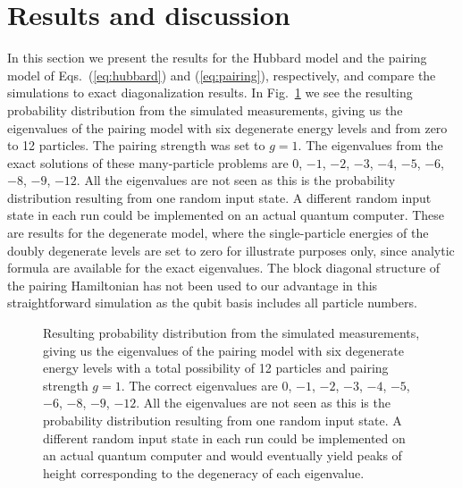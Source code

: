 \documentclass[aps,pra,twocolumn,floatfix]{revtex4}
\begin{document}
\section{Results and discussion}
\label{sec:results}
In this section we present the results for the Hubbard model and the
pairing model of Eqs.~(\ref{eq:hubbard}) and (\ref{eq:pairing}), respectively, and
compare the simulations to exact diagonalization results. 
In Fig.~\ref{fig:P24-13-15IM} we see the resulting probability
distribution from the simulated measurements, giving us the eigenvalues
of the pairing model with six degenerate energy levels and from zero
to  12  particles. 
The pairing strength was set to $g=1$.
The  eigenvalues from the exact solutions of these many-particle
problems are $0$, $-1$, 
$-2$,  $-3$, $-4$, $-5$, $-6$, $-8$, $ -9$, $-12$.
All the eigenvalues are not seen as this is the probability
distribution resulting from one random input state. A
different random input state in each run could be implemented on
an actual quantum computer. These are results for the degenerate
model, where the single-particle energies of the doubly degenerate levels are set to 
zero  for illustrate purposes only, since analytic formula are available for the 
exact eigenvalues. The block diagonal structure of the pairing
Hamiltonian has not been used to our advantage in this straightforward
simulation as the qubit basis includes all particle numbers. 
\begin{figure}[h!]
\begin{center}
	\caption{Resulting probability
          distribution from the simulated measurements, giving us the eigenvalues
          of the pairing model with six degenerate energy levels with a total
          possibility of 12  particles and pairing strength $g=1$. 
          The correct eigenvalues are $0$, $-1$, 
          $-2$,  $-3$, $-4$, $-5$, $-6$, $-8$, $ -9$, $-12$.
          All the eigenvalues are not seen as this is the probability
          distribution resulting from one random input state. A
          different random input state in each run could be implemented on
          an actual quantum computer and would eventually yield peaks
          of height corresponding to the degeneracy of each eigenvalue. }
	\label{fig:P24-13-15IM}
\end{center} 
\end{figure}
\end{document}
